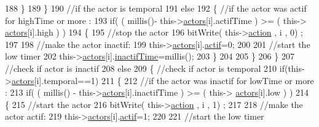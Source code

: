 \begin{DoxyCode}
188                     \}
189                 \}
190                 \textcolor{comment}{//if the actor is temporal}
191                 \textcolor{keywordflow}{else}
192                 \{   \textcolor{comment}{//if the actor was actif for highTime or more :}
193                     \textcolor{keywordflow}{if}( ( millis()- this->\hyperlink{classJetpack_a7e16d2f97837f9712a2e6de1c50d99db}{actors}[i].actifTime  ) >= ( this->
      \hyperlink{classJetpack_a7e16d2f97837f9712a2e6de1c50d99db}{actors}[i].high  ) )
194                     \{
195                         \textcolor{comment}{//stop the actor}
196                         bitWrite( this->\hyperlink{classJetpack_aca3142925a7b0834b34ae91d26af7765}{action} , i , 0) ;
197 
198                         \textcolor{comment}{//make the actor inactif:}
199                         this->\hyperlink{classJetpack_a7e16d2f97837f9712a2e6de1c50d99db}{actors}[i].\hyperlink{structJetpack_1_1state_aa177541689bbaea21a4650a083b0df77}{actif}=0;
200 
201                         \textcolor{comment}{//start the low timer}
202                         this->\hyperlink{classJetpack_a7e16d2f97837f9712a2e6de1c50d99db}{actors}[i].\hyperlink{structJetpack_1_1state_aaf817b1f9e7a4d65b9e3ca4726b281f6}{inactifTime}=millis();              
203                     \}           
204                             
205                 \}
206             \}
207             \textcolor{comment}{//check if actor is inactif}
208             \textcolor{keywordflow}{else}
209             \{   \textcolor{comment}{//check if actor is temporal}
210                 \textcolor{keywordflow}{if}(this->\hyperlink{classJetpack_a7e16d2f97837f9712a2e6de1c50d99db}{actors}[i].temporal==1)
211                 \{
212                     \textcolor{comment}{//if the actor was inactif for lowTime or more :}
213                     \textcolor{keywordflow}{if}( ( millis() - this->\hyperlink{classJetpack_a7e16d2f97837f9712a2e6de1c50d99db}{actors}[i].inactifTime ) >= ( this->
      \hyperlink{classJetpack_a7e16d2f97837f9712a2e6de1c50d99db}{actors}[i].low  ) )
214                     \{
215                         \textcolor{comment}{//start the actor}
216                         bitWrite( this->\hyperlink{classJetpack_aca3142925a7b0834b34ae91d26af7765}{action} , i , 1) ;
217 
218                         \textcolor{comment}{//make the actor actif:}
219                         this->\hyperlink{classJetpack_a7e16d2f97837f9712a2e6de1c50d99db}{actors}[i].\hyperlink{structJetpack_1_1state_aa177541689bbaea21a4650a083b0df77}{actif}=1;
220 
221                         \textcolor{comment}{//start the low timer}

\end{DoxyCode}
